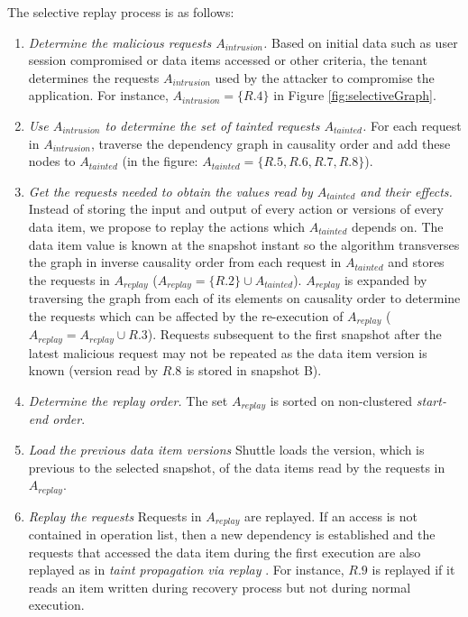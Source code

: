 The selective replay process is as follows:
\begin{enumerate}
\item \textit{Determine the malicious requests $A_{intrusion}$.}
Based on initial data such as user session compromised or data items accessed or other criteria, the tenant determines the requests $A_{intrusion}$ used by the attacker to compromise the application. For instance, $A_{intrusion} = \{R.4\} $ in Figure \ref{fig:selectiveGraph}.

\item \textit{Use $A_{intrusion}$ to determine the set of tainted requests $A_{tainted}$.}
For each request in $A_{intrusion}$, traverse the dependency graph in causality order and add these nodes to $A_{tainted}$ (in the figure: $A_{tainted} = \{R.5,R.6,R.7,R.8\}$).


\item \textit{Get the requests needed to obtain the values read by $A_{tainted}$ and their effects.} 
Instead of storing the input and output of every action or versions of every data item, we propose to replay the actions which $A_{tainted}$ depends on. The data item value is known at the snapshot instant so the algorithm transverses the graph in inverse causality order from each request in $A_{tainted}$ and stores the requests in $A_{replay}$ ($A_{replay} = \{R.2\} \cup A_{tainted}$). $A_{replay}$ is expanded by traversing the graph from each of its elements on causality order to determine the requests which can be affected by the re-execution of $A_{replay}$ ($A_{replay} = A_{replay} \cup R.3$). Requests subsequent to the first snapshot after the latest malicious request may not be repeated as the data item version is known (version read by $R.8$ is stored in snapshot B).

\item \textit{Determine the replay order.} 
The set $A_{replay}$ is sorted on non-clustered \emph{start-end order}.

\item \textit{Load the previous data item versions}
Shuttle loads the version, which is previous to the selected snapshot, of the data items read by the requests in $A_{replay}$.

\item \textit{Replay the requests}
Requests in $A_{replay}$ are replayed. If an access is not contained in operation list, then a new dependency is established and the requests that accessed the data item during the first execution are also replayed as in \emph{taint propagation via replay} \cite{retro}. For instance, $R.9$ is replayed if it reads an item written during recovery process but not during normal execution. 
\end{enumerate}

